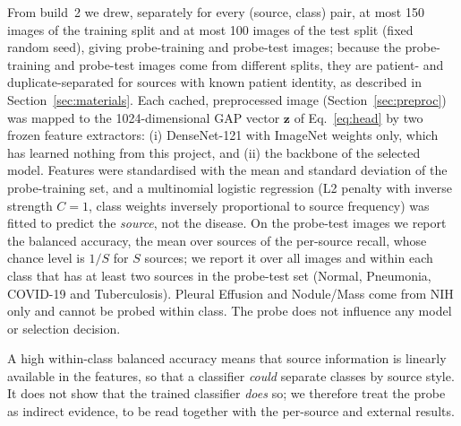 From build~2 we drew, separately for every (source, class) pair, at most 150 images of the training split and at most 100 images of the test split (fixed random seed), giving \RProbeNTrain{} probe-training and \RProbeNTest{} probe-test images; because the probe-training and probe-test images come from different splits, they are patient- and duplicate-separated for sources with known patient identity, as described in Section~\ref{sec:materials}. Each cached, preprocessed image (Section~\ref{sec:preproc}) was mapped to the 1024-dimensional GAP vector $\mathbf{z}$ of Eq.~\eqref{eq:head} by two frozen feature extractors: (i) DenseNet-121 with ImageNet weights only, which has learned nothing from this project, and (ii) the backbone of the selected model. Features were standardised with the mean and standard deviation of the probe-training set, and a multinomial logistic regression (L2 penalty with inverse strength $C=1$, class weights inversely proportional to source frequency) was fitted to predict the \emph{source}, not the disease. On the probe-test images we report the balanced accuracy, the mean over sources of the per-source recall, whose chance level is $1/S$ for $S$ sources; we report it over all images and within each class that has at least two sources in the probe-test set (Normal, Pneumonia, COVID-19 and Tuberculosis). Pleural Effusion and Nodule/Mass come from NIH only and cannot be probed within class. The probe does not influence any model or selection decision.

A high within-class balanced accuracy means that source information is linearly available in the features, so that a classifier \emph{could} separate classes by source style. It does not show that the trained classifier \emph{does} so; we therefore treat the probe as indirect evidence, to be read together with the per-source and external results.
